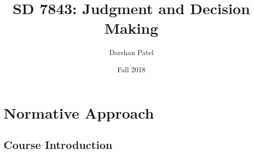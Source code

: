 \documentclass[12pt]{article}
\begin{document}
\theoremstyle{definition}
\newtheorem{theorem}{Theorem}[section]
\newtheorem{definition}{Definition}[section]
\newtheorem{example}{Example}[section]

\title{SD 7843: Judgment and Decision Making}
\author{Darshan Patel}
\date{Fall 2018}
\maketitle

\tableofcontents 
\newpage
\section{Normative Approach}

\subsection{Course Introduction}
\end{document}
